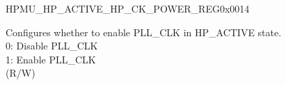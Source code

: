 \begin{register}{H}{PMU\_HP\_ACTIVE\_HP\_CK\_POWER\_REG}{0x0014}\label{regdesc:PMUHPACTIVEHPCKPOWERREG}
%
%
%
\regnewline%
\begin{regdesc}\begin{reglist}
\label{fielddesc:PMUHPACTIVEXPDBBPLL}\item [PMU\_HP\_ACTIVE\_XPD\_BBPLL] Configures whether to  enable PLL\_CLK in HP\_ACTIVE state.\\
0: Disable PLL\_CLK\\
1: Enable PLL\_CLK\\
(R/W)
\end{reglist}\end{regdesc}
\end{register}


